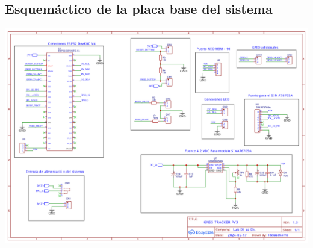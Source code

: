 
\begin{landscape}

\chapter{Esquemáctico de la placa base del sistema} %
\label{AppendixA} %



\includegraphics[scale=.4]{./Appendices/Esquematico_placa_base.pdf}



\end{landscape}

%
